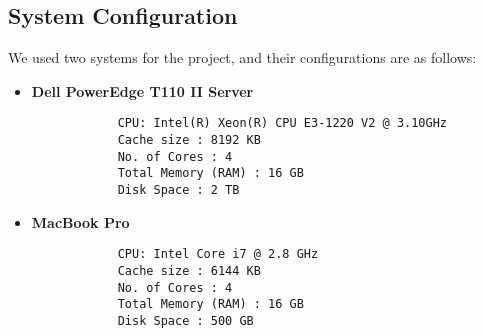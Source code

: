 \subsection{System Configuration}

We used two systems for the project, and their configurations are as follows:
\begin{itemize}
	\item \textbf{Dell PowerEdge T110 II Server}
		\begin{verbatim}
			CPU: Intel(R) Xeon(R) CPU E3-1220 V2 @ 3.10GHz
			Cache size : 8192 KB
			No. of Cores : 4
			Total Memory (RAM) : 16 GB
			Disk Space : 2 TB	
		\end{verbatim}
	\item \textbf{MacBook Pro}
			\begin{verbatim}
			CPU: Intel Core i7 @ 2.8 GHz
			Cache size : 6144 KB
			No. of Cores : 4
			Total Memory (RAM) : 16 GB
			Disk Space : 500 GB	
			\end{verbatim}
\end{itemize}
